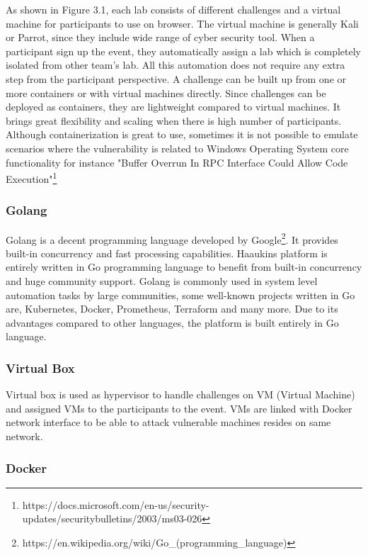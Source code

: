 As shown in Figure 3.1, each lab consists of different challenges and a virtual machine for participants to use on browser. The virtual machine is generally Kali or Parrot, since they include wide range of cyber security tool. When a participant sign up the event, they automatically assign a lab which is completely isolated from other team's lab. All this automation does not require any extra step from the participant perspective. A challenge can be built up from one or more containers or with virtual machines directly. Since challenges can be deployed as containers, they are lightweight compared to virtual machines. It brings great flexibility and scaling when there is high number of participants. Although containerization is great to use, sometimes it is not possible to emulate scenarios where the vulnerability is related to Windows Operating System core functionality for instance "Buffer Overrun In RPC Interface Could Allow Code Execution"\footnote{https://docs.microsoft.com/en-us/security-updates/securitybulletins/2003/ms03-026}


\subsubsection{Golang}

Golang is a decent programming language developed by Google\footnote{https://en.wikipedia.org/wiki/Go_(programming_language)}. It provides built-in concurrency and fast processing capabilities. Haaukins platform is entirely written in Go programming language to benefit from built-in concurrency and huge community support. 
Golang is commonly used in system level automation tasks by large communities, some well-known projects written in Go are, Kubernetes, Docker, Prometheus, Terraform and many more. 
Due to its advantages compared to other languages, the platform is built entirely in Go language. 

\subsubsection{Virtual Box}

Virtual box is used as hypervisor to handle challenges on VM (Virtual Machine) and assigned VMs to the participants to the event. VMs are linked with Docker network interface to be able to attack vulnerable machines resides on same network. 
\subsubsection{Docker}

